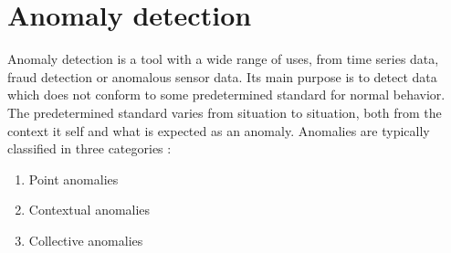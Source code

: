 \section{Anomaly detection}
Anomaly detection is a tool with a wide range of uses, from time series data, fraud detection or anomalous sensor data. 
Its main purpose is to detect data which does not conform to some predetermined standard for normal behavior. 
The predetermined standard varies from situation to situation, both from the context it self and what is expected as an anomaly. 
Anomalies are typically classified in three categories \cite{anom_detec}:


\begin{enumerate}
    \item Point anomalies
    \item Contextual anomalies
    \item Collective anomalies
\end{enumerate}

